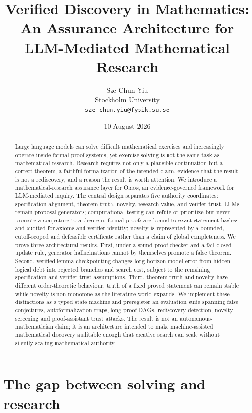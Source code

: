 \documentclass[11pt]{article}
\title{Verified Discovery in Mathematics: An Assurance Architecture for LLM-Mediated Mathematical Research}
\author{Sze Chun Yiu\\Stockholm University\\\texttt{sze-chun.yiu@fysik.su.se}}
\date{10 August 2026}
\newcommand{\RAKL}{\textsc{Orion}}
\begin{document}
\maketitle

\begin{abstract}
Large language models can solve difficult mathematical exercises and increasingly operate inside formal proof systems, yet exercise solving is not the same task as mathematical research. Research requires not only a plausible continuation but a correct theorem, a faithful formalization of the intended claim, evidence that the result is not a rediscovery, and a reason the result is worth attention. We introduce a mathematical-research assurance layer for \RAKL{}, an evidence-governed framework for LLM-mediated inquiry. The central design separates five authority coordinates: specification alignment, theorem truth, novelty, research value, and verifier trust. LLMs remain proposal generators; computational testing can refute or prioritize but never promote a conjecture to a theorem; formal proofs are bound to exact statement hashes and audited for axioms and verifier identity; novelty is represented by a bounded, cutoff-scoped and defeasible certificate rather than a claim of global completeness. We prove three architectural results. First, under a sound proof checker and a fail-closed update rule, generator hallucinations cannot by themselves promote a false theorem. Second, verified lemma checkpointing changes long-horizon model error from hidden logical debt into rejected branches and search cost, subject to the remaining specification and verifier trust assumptions. Third, theorem truth and novelty have different order-theoretic behaviour: truth of a fixed proved statement can remain stable while novelty is non-monotone as the literature world expands. We implement these distinctions as a typed state machine and preregister an evaluation suite spanning false conjectures, autoformalization traps, long proof DAGs, rediscovery detection, novelty screening and proof-assistant trust attacks. The result is not an autonomous-mathematician claim; it is an architecture intended to make machine-assisted mathematical discovery auditable enough that creative search can scale without silently scaling mathematical authority.
\end{abstract}

\section{The gap between solving and research}
\end{document}
